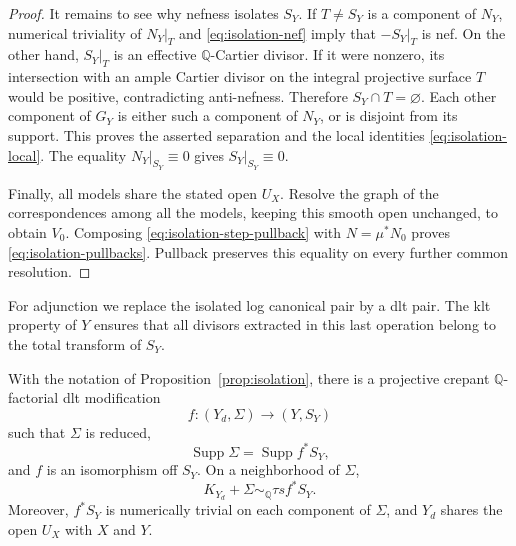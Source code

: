 \begin{proof}
It remains to see why nefness isolates $S_Y$.  If $T\ne S_Y$ is a
component of $N_Y$, numerical triviality of $N_Y|_T$ and
\eqref{eq:isolation-nef} imply that $-S_Y|_T$ is nef.  On the other
hand, $S_Y|_T$ is an effective $\mathbb Q$-Cartier divisor.  If it
were nonzero, its intersection with an ample Cartier divisor on the
integral projective surface $T$ would be positive, contradicting
anti-nefness.  Therefore $S_Y\cap T=\varnothing$.  Each other
component of $G_Y$ is either such a component of $N_Y$, or is
disjoint from its support.  This proves the asserted separation and
the local identities \eqref{eq:isolation-local}.  The equality
$N_Y|_{S_Y}\equiv0$ gives $S_Y|_{S_Y}\equiv0$.

Finally, all models share the stated open $U_X$.  Resolve the graph
of the correspondences among all the models, keeping this smooth
open unchanged, to obtain $V_0$.  Composing
\eqref{eq:isolation-step-pullback} with $N=\mu^*N_0$ proves
\eqref{eq:isolation-pullbacks}.  Pullback preserves this equality on
every further common resolution.
\end{proof}

For adjunction we replace the isolated log canonical pair by a dlt
pair.  The klt property of $Y$ ensures that all divisors extracted in
this last operation belong to the total transform of $S_Y$.

\begin{samepage}
\begin{corollary}\label{lem:dlt-boundary}
With the notation of Proposition~\ref{prop:isolation}, there is a
projective crepant $\mathbb Q$-factorial dlt modification
\[
  f:(Y_d,\Sigma)\longrightarrow (Y,S_Y)
\]
such that $\Sigma$ is reduced,
\begin{equation}\label{eq:dlt-support}
  \operatorname{Supp}\Sigma=\operatorname{Supp}f^*S_Y,
\end{equation}
and $f$ is an isomorphism off $S_Y$.  On a neighborhood of $\Sigma$,
\begin{equation}\label{eq:dlt-local}
  K_{Y_d}+\Sigma\sim_{\mathbb Q}\tau s f^*S_Y.
\end{equation}
Moreover, $f^*S_Y$ is numerically trivial on each component of
$\Sigma$, and $Y_d$ shares the open $U_X$ with $X$ and $Y$.
\end{corollary}
\end{samepage}

